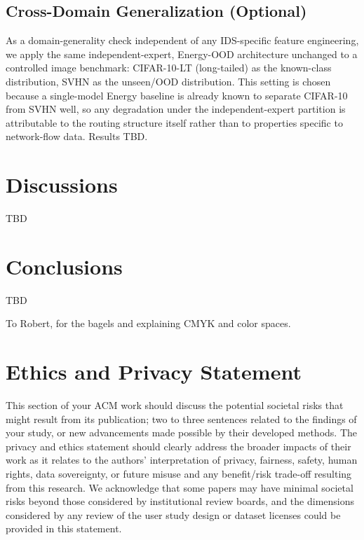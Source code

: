 \documentclass[sigconf]{acmart}
\begin{document}
\subsection{Cross-Domain Generalization (Optional)}
As a domain-generality check independent of any IDS-specific feature engineering, we apply the same independent-expert, Energy-OOD architecture unchanged to a controlled image benchmark: CIFAR-10-LT (long-tailed) as the known-class distribution, SVHN as the unseen/OOD distribution. This setting is chosen because a single-model Energy baseline is already known to separate CIFAR-10 from SVHN well, so any degradation under the independent-expert partition is attributable to the routing structure itself rather than to properties specific to network-flow data. Results TBD.

\section{Discussions}
TBD

\section{Conclusions}
TBD

\begin{acks}
To Robert, for the bagels and explaining CMYK and color spaces.
\end{acks}


\section*{Ethics and Privacy Statement}

This section of your ACM work should discuss the potential societal
risks that might result from its publication; two to three sentences
related to the findings of your study, or new advancements made
possible by their developed methods. The privacy and ethics statement
should clearly address the broader impacts of their work as it relates
to the authors' interpretation of privacy, fairness, safety, human
rights, data sovereignty, or future misuse and any benefit/risk
trade-off resulting from this research. We acknowledge that some
papers may have minimal societal risks beyond those considered by
institutional review boards, and the dimensions considered by any
review of the user study design or dataset licenses could be provided
in this statement.
\end{document}
